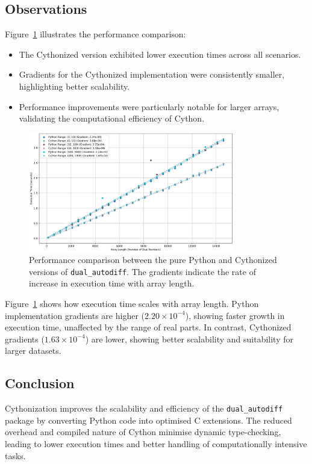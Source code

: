 \documentclass[a4paper,12pt]{article}
\begin{document}
\subsection{Observations}
Figure~\ref{fig:performance_comparison} illustrates the performance comparison:
\begin{itemize}
    \item The Cythonized version exhibited lower execution times across all scenarios.
    \item Gradients for the Cythonized implementation were consistently smaller, highlighting better scalability.
    \item Performance improvements were particularly notable for larger arrays, validating the computational efficiency of Cython.
\end{itemize}

\begin{figure}[h!]
    \centering
    \includegraphics[width=0.8\textwidth]{performance_comparison.png}
    \caption{Performance comparison between the pure Python and Cythonized versions of \texttt{dual\_autodiff}. The gradients indicate the rate of increase in execution time with array length.}
    \label{fig:performance_comparison}
\end{figure}

Figure~\ref{fig:performance_comparison} shows how execution time scales with array length. Python implementation gradients are higher (\(2.20 \times 10^{-4}\)), showing faster growth in execution time, unaffected by the range of real parts. In contrast, Cythonized gradients (\(1.63 \times 10^{-4}\)) are lower, showing better scalability and suitability for larger datasets.

\subsection{Conclusion}
Cythonization improves the scalability and efficiency of the \texttt{dual\_autodiff} package by converting Python code into optimised C extensions. The reduced overhead and compiled nature of Cython minimise dynamic type-checking, leading to lower execution times and better handling of computationally intensive tasks.
\end{document}
